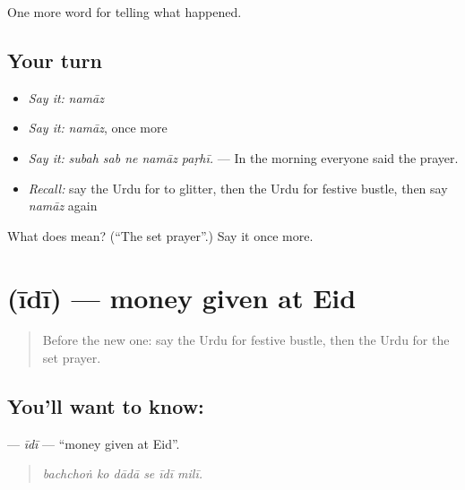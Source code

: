 \begin{grammarlens}[title={What you've built}]
One more word for telling what happened.
\end{grammarlens}

\subsection*{Your turn}
\begin{itemize}
\raggedright
  \item \emph{Say it:} \emph{namāz}
  \item \emph{Say it:} \emph{namāz}, once more
  \item \emph{Say it:} \emph{subah sab ne namāz paṛhī.} — In the morning everyone said the prayer.
  \item \emph{Recall:} say the Urdu for to glitter, then the Urdu for festive bustle, then say \emph{namāz} again
\end{itemize}

\begin{tcolorbox}[breakable,colback=teal!4,colframe=teal!35!black,title={Before you move on}]
What does  mean? (\textquotedblleft{}The set prayer\textquotedblright{}.) Say it once more.
\end{tcolorbox}
\section[\texorpdfstring{\ur{عیدی} (īdī)}{عیدی (īdī)}]{ (īdī) — money given at Eid}

\label{lesson:UR-C318-idi}



\begin{quote}
Before the new one: say the Urdu for festive bustle, then the Urdu for the set prayer.
\end{quote}

\subsection*{You'll want to know: }
\textbf{} — \emph{īdī} — \textquotedblleft{}money given at Eid\textquotedblright{}.

\begin{quote}
     
\end{quote}

\begin{quote}
\emph{bachchoṅ ko dādā se īdī milī.}
\end{quote}

